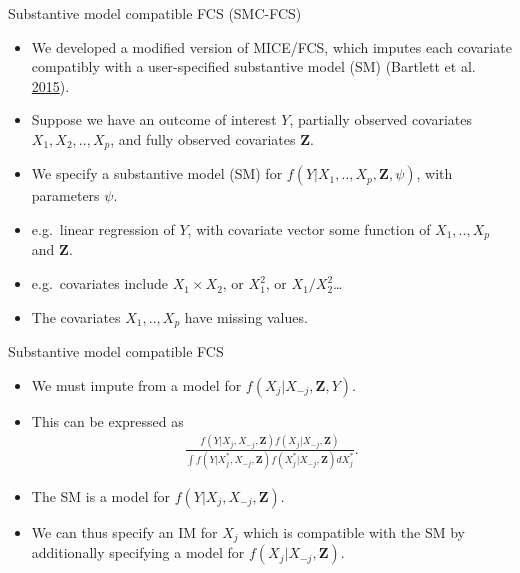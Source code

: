 \documentclass[ignorenonframetext,]{beamer}
\providecommand{\tightlist}{%
  \setlength{\itemsep}{0pt}\setlength{\parskip}{0pt}}
\begin{document}
\begin{frame}{Substantive model compatible FCS (SMC-FCS)}
\protect\hypertarget{substantive-model-compatible-fcs-smc-fcs}{}

\begin{itemize}
\tightlist
\item
  We developed a modified version of MICE/FCS, which imputes each
  covariate compatibly with a user-specified substantive model (SM)
  (Bartlett et al. \protect\hyperlink{ref-Bartlett2014}{2015}).
\item
  Suppose we have an outcome of interest \(Y\), partially observed
  covariates \(X_{1},X_{2},..,X_{p}\), and fully observed covariates
  \(\mathbf Z\).
\item
  We specify a substantive model (SM) for
  \(f(Y|X_{1},..,X_{p},\mathbf Z,\psi)\), with parameters \(\psi\).
\item
  e.g.~linear regression of \(Y\), with covariate vector some function
  of \(X_{1},..,X_{p}\) and \(\mathbf Z\).
\item
  e.g.~covariates include \(X_{1} \times X_{2}\), or \(X_{1}^2\), or
  \(X_{1}/X_{2}^2\)\ldots{}
\item
  The covariates \(X_{1},..,X_{p}\) have missing values.
\end{itemize}

\end{frame}

\begin{frame}{Substantive model compatible FCS}
\protect\hypertarget{substantive-model-compatible-fcs}{}

\begin{itemize}
\tightlist
\item
  We must impute from a model for \(f(X_{j}|X_{-j},\mathbf Z,Y)\).
\item
  This can be expressed as \begin{align*}
    \frac{f(Y|X_{j},X_{-j},\mathbf Z)f(X_{j}|X_{-j},\mathbf Z)}{\int f(Y|X^{*}_{j},X_{-j},\mathbf Z) f(X^{*}_{j}|X_{-j},\mathbf Z) dX^{*}_{j}}.
    \end{align*}
\item
  The SM is a model for \(f(Y|X_{j},X_{-j},\mathbf Z)\).
\item
  We can thus specify an IM for \(X_{j}\) which is compatible with the
  SM by additionally specifying a model for
  \(f(X_{j}|X_{-j},\mathbf Z)\).
\end{itemize}

\end{frame}
\end{document}
